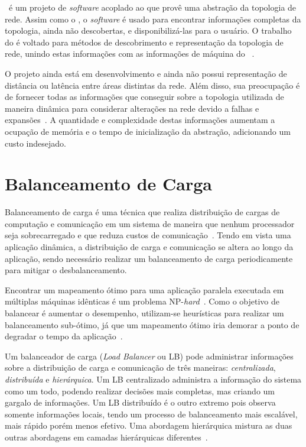 \Netloc~é um projeto de \textit{software} acoplado ao \hwloc que provê uma abstração da topologia de rede.
Assim como o \hwloc, o \textit{software} é usado para encontrar informações completas da topologia, ainda não descobertas, e disponibilizá-las para o usuário.
O trabalho do \netloc é voltado para métodos de descobrimento e representação da topologia de rede, unindo estas informações com as informações de máquina do \hwloc~\cite{Goglin:netloc}.

O projeto \netloc ainda está em desenvolvimento e ainda não possui representação de distância ou latência entre áreas distintas da rede.
Além disso, sua preocupação é de fornecer todas as informações que conseguir sobre a topologia utilizada de maneira dinâmica para considerar alterações na rede devido a falhas e expansões~\cite{Goglin:netloc}.
A quantidade e complexidade destas informações aumentam a ocupação de memória e o tempo de inicialização da abstração, adicionando um custo indesejado.

\section{Balanceamento de Carga}
\label{sec:lb}

Balanceamento de carga é uma técnica que realiza distribuição de cargas de computação e comunicação em um sistema de maneira que nenhum processador seja sobrecarregado e que reduza custos de comunicação~\cite{Becker}. 
Tendo em vista uma aplicação dinâmica, a distribuição de carga e comunicação se altera ao longo da aplicação, sendo necessário realizar um balanceamento de carga periodicamente para mitigar o desbalanceamento. 

Encontrar um mapeamento ótimo para uma aplicação paralela executada em múltiplas máquinas idênticas é um problema NP-\textit{hard}~\cite{leung}. 
Como o objetivo de balancear é aumentar o desempenho, utilizam-se heurísticas para realizar um balanceamento sub-ótimo, já que um mapeamento ótimo iria demorar a ponto de degradar o tempo da aplicação~\cite{pilla-thesis}.

Um balanceador de carga (\textit{Load Balancer} ou LB) pode administrar informações sobre a distribuição de carga e comunicação de três maneiras: \textit{centralizada}, \textit{distribuída} e \textit{hierárquica}.
Um LB centralizado administra a informação do sistema como um todo, podendo realizar decisões mais completas, mas criando um gargalo de informações. 
Um LB distribuído é o outro extremo pois observa somente informações locais, tendo um processo de balanceamento mais escalável, mais rápido porém menos efetivo. 
Uma abordagem hierárquica mistura as duas outras abordagens em camadas hierárquicas diferentes~\cite{Becker}.

